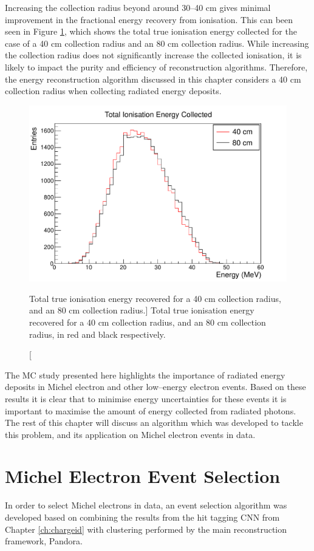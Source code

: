 Increasing the collection radius beyond around 30--40 cm gives minimal
improvement in the fractional energy recovery from ionisation. This can been
seen in Figure \ref{fig:40_v_80}, which shows the total true ionisation energy
collected for the case of a 40 cm collection radius and an 80 cm collection
radius. While increasing the collection radius does not significantly increase
the collected ionisation, it is likely to impact the purity and efficiency of 
reconstruction algorithms. Therefore, the energy reconstruction algorithm 
discussed in this chapter considers a 40 cm collection radius when collecting 
radiated energy deposits.
\begin{figure}
	\centering
	\includegraphics[width=\textwidth]{figures/40_v_80.pdf}
	\caption
	[Total true ionisation energy recovered for a 40 cm collection radius, and an
	80 cm collection radius.]
	{Total true ionisation energy recovered for a 40 cm collection radius, and an
	80 cm collection radius, in red and black respectively.}
	\label{fig:40_v_80}
\end{figure}

The MC study presented here highlights the importance of radiated energy
deposits in Michel electron and other low--energy electron events. Based on
these results it is clear that to minimise energy uncertainties for these events
it is important to maximise the amount of energy collected from radiated 
photons. The rest of this chapter will discuss an algorithm which was developed 
to tackle this problem, and its application on Michel electron events in 
\protodune{} data.

\section{Michel Electron Event Selection} \label{ME_ES}
In order to select Michel electrons in \protodune{} data, an event selection
algorithm was developed based on combining the results from the hit tagging CNN 
from Chapter \ref{ch:chargeid} with clustering performed by the main 
\protodune{} reconstruction framework, Pandora. 

